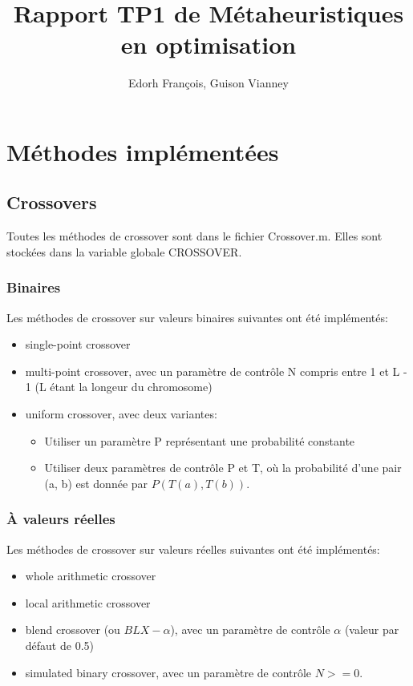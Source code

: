 \documentclass[12pt, letterpaper]{article}
\author{Edorh François, Guison Vianney}
\title{Rapport TP1 de Métaheuristiques en optimisation}
\begin{document}
\section{Méthodes implémentées}

\subsection{Crossovers}

Toutes les méthodes de crossover sont dans le fichier Crossover.m.
Elles sont stockées dans la variable globale CROSSOVER.

\subsubsection{Binaires}

Les méthodes de crossover sur valeurs binaires suivantes ont été implémentés:
\begin{itemize}
\item single-point crossover\\
  
\item multi-point crossover, avec un paramètre de contrôle N compris
entre 1 et L - 1 (L étant la longeur du chromosome)\\
  
\item uniform crossover, avec deux variantes:
  \begin{itemize}
  \item Utiliser un paramètre P représentant une probabilité constante\\
    
  \item Utiliser deux paramètres de contrôle P et T, où la probabilité
    d'une pair (a, b) est donnée par $P(T(a), T(b))$.\\
    
  \end{itemize}
\end{itemize}

\subsubsection{À valeurs réelles}

Les méthodes de crossover sur valeurs réelles suivantes ont été implémentés:

\begin{itemize}
\item whole arithmetic crossover\\
  
\item local arithmetic crossover\\
  
\item blend crossover (ou $BLX-\alpha$), avec un paramètre de contrôle
  $\alpha$ (valeur par défaut de 0.5)\\
  
\item simulated binary crossover, avec un paramètre de contrôle $N >= 0$.\\
\end{itemize}
\end{document}
